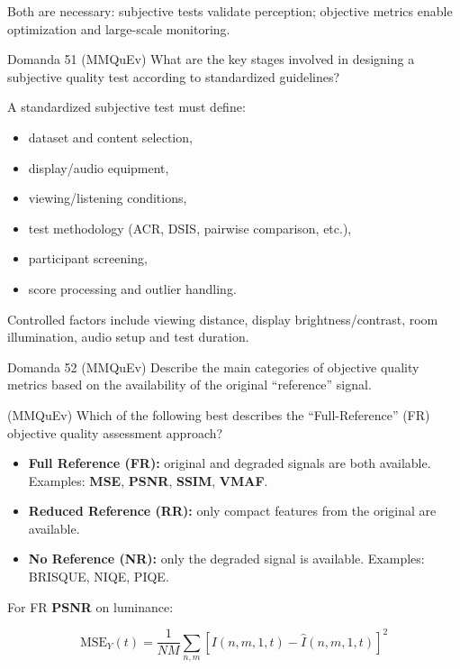 Both are necessary: subjective tests validate perception; objective metrics enable optimization and large-scale monitoring.



\begin{questionbox}{Domanda 51}
(MMQuEv) What are the key stages involved in designing a subjective quality test according to standardized guidelines?
\end{questionbox}


A standardized subjective test must define:

\begin{itemize}
  \item dataset and content selection,
  \item display/audio equipment,
  \item viewing/listening conditions,
  \item test methodology (ACR, DSIS, pairwise comparison, etc.),
  \item participant screening,
  \item score processing and outlier handling.
\end{itemize}

Controlled factors include viewing distance, display brightness/contrast, room illumination, audio setup and test duration.



\begin{questionbox}{Domanda 52}
(MMQuEv) Describe the main categories of objective quality metrics based on the availability of the original “reference” signal.

(MMQuEv) Which of the following best describes the “Full-Reference” (FR) objective quality assessment approach?
\end{questionbox}


\begin{itemize}
  \item \textbf{Full Reference (FR):} original and degraded signals are both available. Examples: \textbf{MSE}, \textbf{PSNR}, \textbf{SSIM}, \textbf{VMAF}.
  \item \textbf{Reduced Reference (RR):} only compact features from the original are available.
  \item \textbf{No Reference (NR):} only the degraded signal is available. Examples: BRISQUE, NIQE, PIQE.
\end{itemize}

For FR \textbf{PSNR} on luminance:


$$
\text{MSE}_Y(t)=\frac{1}{NM}\sum_{n,m}[I(n,m,1,t)-\hat{I}(n,m,1,t)]^2
$$



